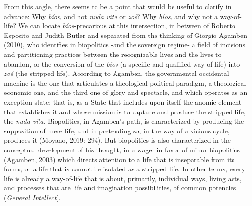 \documentclass[a4paper,]{scrartcl}
\begin{document}
From this angle, there seems to be a point that would be useful to
clarify in advance: Why \emph{bíos}, and not \emph{nuda vita} or
\emph{zoé}? Why \emph{bíos}, and why not a way-of-life? We can locate
\emph{bíos}-precarious at this intersection, in between of Roberto
Esposito and Judith Butler and separated from the thinking of Giorgio
Agamben (2010), who identifies in biopolitics -and the sovereign regime-
a field of incisions and partitioning practices between the recognizable
lives and the lives to abandon, or the conversion of the \emph{bíos} (a
specific and qualified way of life) into \emph{zoé} (the stripped life).
According to Agamben, the governmental occidental machine is the one
that articulates a theological-political paradigm, a
theological-economic one, and the third one of glory and spectacle, and
which operates as an exception state; that is, as a State that includes
upon itself the anomic element that establishes it and whose mission is
to capture and produce the stripped life, the \emph{nuda vita}.
Biopolitics, in Agamben's path, is characterized by producing the
supposition of mere life, and in pretending so, in the way of a vicious
cycle, produces it (Moyano, 2019: 294). But biopolitics is also
characterized in the conceptual development of his thought, in a wager
in favor of minor biopolitics (Agamben, 2003) which directs attention to
a life that is inseparable from its forms, or a life that is cannot be
isolated as a stripped life. In other terms, every life is already a
way-of-life that is about, primarily, individual ways, living acts, and
processes that are life and imagination possibilities, of common
potencies (\emph{General Intellect}).
\end{document}
